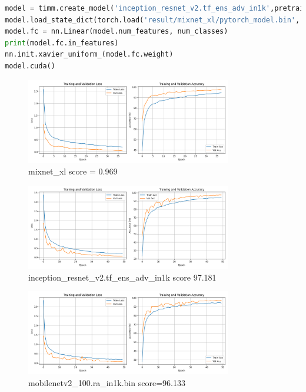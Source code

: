 \documentclass[12pt,a4paper,UTF8]{article}
\begin{document}
\begin{lstlisting}[language=Python, caption=使用timm库进行训练，核心代码]
model = timm.create_model('inception_resnet_v2.tf_ens_adv_in1k',pretrained=False)
model.load_state_dict(torch.load('result/mixnet_xl/pytorch_model.bin', map_location=device))
model.fc = nn.Linear(model.num_features, num_classes)
print(model.fc.in_features)
nn.init.xavier_uniform_(model.fc.weight)
model.cuda()
\end{lstlisting}

\begin{figure}[htbp] \centering \includegraphics[width=0.8\textwidth]{figures/2024-12-12-19-28-14.png} \caption{mixnet\_xl score = 0.969} \end{figure}

\begin{figure}[htbp] \centering \includegraphics[width=0.8\textwidth]{figures/2024-12-12-19-28-41.png} \caption{inception\_resnet\_v2.tf\_ens\_adv\_in1k score 97.181} \end{figure}

\begin{figure}[htbp] \centering \includegraphics[width=0.8\textwidth]{figures/2024-12-12-19-29-39.png} \caption{mobilenetv2\_100.ra\_in1k.bin score=96.133} \end{figure}
\end{document}
